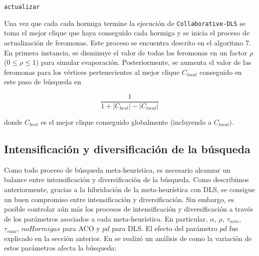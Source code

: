\documentclass[conference]{IEEEtran}
\begin{document}
\begin{scriptsize}
\LinesNumbered
\begin{algoritmo}[htp]
\label{aco:update}

 \caption{\texttt{actualizar}}
  \DontPrintSemicolon
\end{algoritmo}
\end{scriptsize}


Una vez que cada cada hormiga termine la ejecución de
\texttt{Collaborative-DLS} se toma el mejor clique que haya conseguido
cada hormiga y se inicia el proceso de actualización de
feromonas. Este proceso se encuentra descrito en el algoritmo 7. En
primera instancia, se disminuye el valor de todas las feromonas en un
factor $\rho$ ($0 \leq \rho \leq 1$) para simular
evaporación. Posteriormente, se aumenta el valor de las feromonas para
los vértices pertenecientes al mejor clique $C_{local}$ conseguido en
este paso de búsqueda en

$$\frac{1}{1+|C_{best}|-|C_{local}|} $$

donde $C_{best}$ es el mejor clique conseguido globalmente (incluyendo
a $C_{local})$.

\subsection{Intensificación y diversificación de la búsqueda}
\label{sec:aco}

Como todo proceso de búsqueda meta-heurística, es necesario alcanzar
un balance entre intensificación y diversificación de la
búsqueda. Como describimos anteriormente, gracias a la hibridación de
la meta-heurística con DLS, se consigue un buen compromiso entre
intensificación y diversificación. Sin embargo, es posible controlar
aún más los procesos de intensificación y diversificación a través de
los parámetros asociados a cada meta-heurística. En particular,
$\alpha$, $\rho$, $\tau_{min}$, $\tau_{max}$, $noHormigas$ para ACO y $pd$ para
DLS. El efecto del parámetro $pd$ fue explicado en la sección
anterior. En \cite{aco2} se realizó un análisis de como la variación
de estos parámetros afecta la búsqueda:
\end{document}
